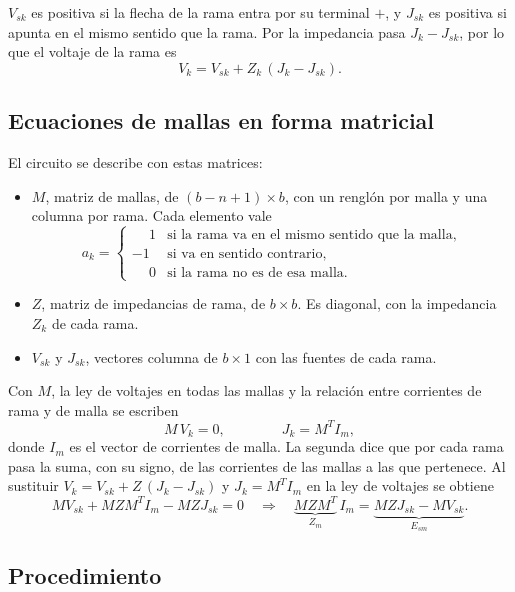 \documentclass[12pt, letterpaper]{article}
\begin{document}
$V_{sk}$ es positiva si la flecha de la rama entra por su terminal $+$, y $J_{sk}$ es positiva si apunta en el mismo
sentido que la rama. Por la impedancia pasa $J_k - J_{sk}$, por lo que el voltaje de la rama es
\[
  V_k = V_{sk} + Z_k\,(J_k - J_{sk}) .
\]

\subsection{Ecuaciones de mallas en forma matricial}

El circuito se describe con estas matrices:
\begin{itemize}
  \item $M$, matriz de mallas, de $(b-n+1) \times b$, con un renglón por malla y una columna por rama. Cada elemento
        vale
        \[
          a_k = \begin{cases}
            \phantom{-}1 & \text{si la rama va en el mismo sentido que la malla,} \\
            -1 & \text{si va en sentido contrario,} \\
            \phantom{-}0 & \text{si la rama no es de esa malla.}
          \end{cases}
        \]
  \item $Z$, matriz de impedancias de rama, de $b \times b$. Es diagonal, con la impedancia $Z_k$ de cada rama.
  \item $V_{sk}$ y $J_{sk}$, vectores columna de $b \times 1$ con las fuentes de cada rama.
\end{itemize}

Con $M$, la ley de voltajes en todas las mallas y la relación entre corrientes de rama y de malla se escriben
\[
  M\,V_k = 0, \qquad\qquad J_k = M^T I_m ,
\]
donde $I_m$ es el vector de corrientes de malla. La segunda dice que por cada rama pasa la suma, con su signo, de las
corrientes de las mallas a las que pertenece. Al sustituir $V_k = V_{sk} + Z\,(J_k - J_{sk})$ y $J_k = M^T I_m$ en la
ley de voltajes se obtiene
\[
  M V_{sk} + M Z M^T I_m - M Z J_{sk} = 0
  \quad\Longrightarrow\quad
  \underbrace{M Z M^T}_{Z_m}\, I_m = \underbrace{M Z J_{sk} - M V_{sk}}_{E_{sm}} .
\]

\subsection{Procedimiento}
\label{sec:procedimiento}
\end{document}
